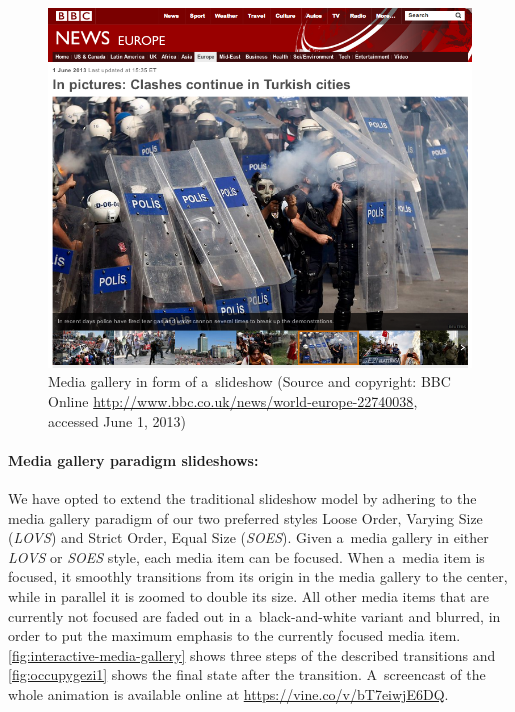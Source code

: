 \begin{figure}[htb]
  \centering
  \includegraphics[width=0.8\columnwidth]{occupygezibbc.png}
  \caption[Media gallery in form of a~slideshow]{Media gallery in form of a~slideshow
  (Source and copyright: BBC Online \url{http://www.bbc.co.uk/news/world-europe-22740038}, accessed June 1, 2013)}
  \label{fig:occupygezibbc}
\end{figure}

\paragraph{Media gallery paradigm slideshows:}

We have opted to extend the traditional slideshow model
by adhering to the media gallery paradigm of our two preferred styles
Loose Order, Varying Size (\emph{LOVS}) and Strict Order, Equal Size (\emph{SOES}).
Given a~media gallery in either \emph{LOVS} or \emph{SOES} style,
each media item can be focused.
When a~media item is focused, it smoothly transitions
from its origin in the media gallery to the center,
while in parallel it is zoomed to double its size.
All other media items that are currently not focused are faded out
in a~black-and-white variant and blurred, in order to put the maximum emphasis
to the currently focused media item.
\autoref{fig:interactive-media-gallery} shows three steps of the described transitions and
\autoref{fig:occupygezi1} shows the final state after the transition.
A~screencast of the whole animation is available online at \url{https://vine.co/v/bT7eiwjE6DQ}.

